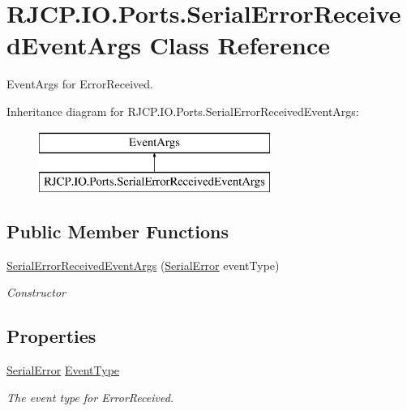 \hypertarget{class_r_j_c_p_1_1_i_o_1_1_ports_1_1_serial_error_received_event_args}{}\section{R\+J\+C\+P.\+I\+O.\+Ports.\+Serial\+Error\+Received\+Event\+Args Class Reference}
\label{class_r_j_c_p_1_1_i_o_1_1_ports_1_1_serial_error_received_event_args}


Event\+Args for Error\+Received.  


Inheritance diagram for R\+J\+C\+P.\+I\+O.\+Ports.\+Serial\+Error\+Received\+Event\+Args\+:\begin{figure}[H]
\begin{center}
\leavevmode
\includegraphics[height=2.000000cm]{class_r_j_c_p_1_1_i_o_1_1_ports_1_1_serial_error_received_event_args}
\end{center}
\end{figure}
\subsection*{Public Member Functions}
\begin{DoxyCompactItemize}
\item 
\mbox{\hyperlink{class_r_j_c_p_1_1_i_o_1_1_ports_1_1_serial_error_received_event_args_a328bd5a5d4283b192b031afe04fb4e21}{Serial\+Error\+Received\+Event\+Args}} (\mbox{\hyperlink{namespace_r_j_c_p_1_1_i_o_1_1_ports_a117eef0f83d73b56ed3f13d084902e98}{Serial\+Error}} event\+Type)
\begin{DoxyCompactList}\small\item\em Constructor \end{DoxyCompactList}\end{DoxyCompactItemize}
\subsection*{Properties}
\begin{DoxyCompactItemize}
\item 
\mbox{\hyperlink{namespace_r_j_c_p_1_1_i_o_1_1_ports_a117eef0f83d73b56ed3f13d084902e98}{Serial\+Error}} \mbox{\hyperlink{class_r_j_c_p_1_1_i_o_1_1_ports_1_1_serial_error_received_event_args_a998aa71e7ea4bb3409188004779e9432}{Event\+Type}}
\begin{DoxyCompactList}\small\item\em The event type for Error\+Received. \end{DoxyCompactList}\end{DoxyCompactItemize}


